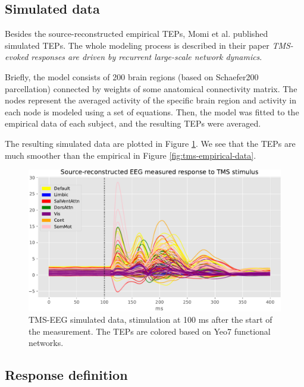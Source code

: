 \subsection{Simulated data}

Besides the source-reconstructed empirical TEPs, Momi et al. published simulated TEPs. The whole modeling process is described in their paper \textit{TMS-evoked responses are driven by recurrent large-scale network dynamics}. 

Briefly, the model consists of 200 brain regions (based on Schaefer200 parcellation) connected by weights of some anatomical connectivity matrix. The nodes represent the averaged activity of the specific brain region and activity in each node is modeled using a set of equations. Then, the model was fitted to the empirical data of each subject, and the resulting TEPs were averaged. \cite{deco_perturbation_2018, momi_tms-evoked_2023}

The resulting simulated data are plotted in Figure \ref{fig:tms-simulated-data}. We see that the TEPs are much smoother than the empirical in Figure \ref{fig:tms-empirical-data}.

\begin{figure}
    \centering
    \includegraphics[width=\textwidth]{images/nootebook_generated/pytepfit_results/simulated/200/not_over_threshold_nan/data.pdf}
    \caption[TMS-EEG simulated data]{TMS-EEG simulated data, stimulation at 100 ms after the start of the measurement. The TEPs are colored based on Yeo7 functional networks.}
    \label{fig:tms-simulated-data}
\end{figure}

\subsection{Response definition}

